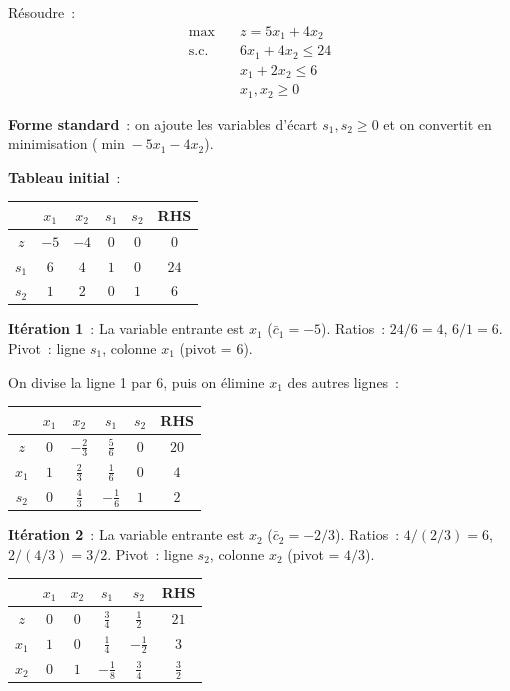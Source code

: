 \begin{exemple}
R\'esoudre~:
\[
\begin{aligned}
  \max \quad & z = 5x_1 + 4x_2 \\
  \text{s.c.} \quad
    & 6x_1 + 4x_2 \le 24 \\
    & x_1 + 2x_2 \le 6 \\
    & x_1, x_2 \ge 0
\end{aligned}
\]

\textbf{Forme standard}~: on ajoute les variables d'\'ecart $s_1, s_2 \ge 0$
et on convertit en minimisation ($\min -5x_1 - 4x_2$).

\textbf{Tableau initial}~:
\begin{center}
\begin{tabular}{c|cccc|c}
  & $x_1$ & $x_2$ & $s_1$ & $s_2$ & RHS \\
  \toprule
  $z$ & $-5$ & $-4$ & $0$ & $0$ & $0$ \\
  \midrule
  $s_1$ & $6$ & $4$ & $1$ & $0$ & $24$ \\
  $s_2$ & $1$ & $2$ & $0$ & $1$ & $6$ \\
\end{tabular}
\end{center}

\textbf{It\'eration 1}~: La variable entrante est $x_1$ ($\bar{c}_1 = -5$).
Ratios~: $24/6 = 4$, $6/1 = 6$.  Pivot~: ligne $s_1$, colonne $x_1$
(pivot = 6).

On divise la ligne 1 par 6, puis on \'elimine $x_1$ des autres lignes~:
\begin{center}
\begin{tabular}{c|cccc|c}
  & $x_1$ & $x_2$ & $s_1$ & $s_2$ & RHS \\
  \toprule
  $z$ & $0$ & $-\frac{2}{3}$ & $\frac{5}{6}$ & $0$ & $20$ \\
  \midrule
  $x_1$ & $1$ & $\frac{2}{3}$ & $\frac{1}{6}$ & $0$ & $4$ \\
  $s_2$ & $0$ & $\frac{4}{3}$ & $-\frac{1}{6}$ & $1$ & $2$ \\
\end{tabular}
\end{center}

\textbf{It\'eration 2}~: La variable entrante est $x_2$ ($\bar{c}_2 = -2/3$).
Ratios~: $4/(2/3) = 6$, $2/(4/3) = 3/2$.  Pivot~: ligne $s_2$, colonne $x_2$
(pivot = $4/3$).

\begin{center}
\begin{tabular}{c|cccc|c}
  & $x_1$ & $x_2$ & $s_1$ & $s_2$ & RHS \\
  \toprule
  $z$ & $0$ & $0$ & $\frac{3}{4}$ & $\frac{1}{2}$ & $21$ \\
  \midrule
  $x_1$ & $1$ & $0$ & $\frac{1}{4}$ & $-\frac{1}{2}$ & $3$ \\
  $x_2$ & $0$ & $1$ & $-\frac{1}{8}$ & $\frac{3}{4}$ & $\frac{3}{2}$ \\
\end{tabular}
\end{center}


\end{exemple}
